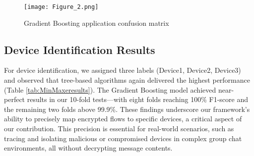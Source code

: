 \documentclass[conference]{IEEEtran}
\begin{document}


 \begin{figure}[!ht]
     \centering
     \texttt{[image: Figure\_2.png]}
     \caption{Gradient Boosting application confusion matrix}
     \label{fig:example}
 \end{figure}

\subsection{Device Identification Results}

For device identification, we assigned three labels (Device1, Device2, Device3) and observed that tree-based algorithms again delivered the highest performance (Table \ref{tab:MinMaxeresults}). The Gradient Boosting model achieved near-perfect results in our 10-fold tests—with eight folds reaching 100\% F1-score and the remaining two folds above 99.9\%. These findings underscore our framework’s ability to precisely map encrypted flows to specific devices, a critical aspect of our contribution. This precision is essential for real-world scenarios, such as tracing and isolating malicious or compromised devices in complex group chat environments, all without decrypting message contents.
\end{document}
